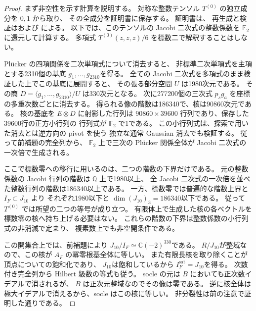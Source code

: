\begin{proof}
まず非空性を示す計算を説明する。
対称な整数テンソル $T^{(0)}$ の独立成分を $0,1$ から取り、
その全成分を証明書に保存する。
証明書は、
再生成と検証はおよび
による。
以下では、このテンソルの Jacobi 二次式の整数係数を
$\mathbb F_2$ に還元して計算する。
多項式 $T^{(0)}(z,z,z)/6$ を標数二で解釈することはしない。

Pl\"ucker の四項関係を二次単項式について消去すると、
非標準二次単項式を主項とする2310個の基底
$g_1,\ldots,g_{2310}$を得る。
全ての Jacobi 二次式を多項式のまま検証した上でこの基底に展開すると、
その張る部分空間 $U$ は1980次元である。
その商 $D=\langle g_1,\ldots,g_{2310}\rangle/U$ は330次元となる。
次に277200個の三次式 $p_sg_a$ を座標の多重次数ごとに消去する。
得られる像の階数は186340で、核は90860次元である。
核の基底を $E\otimes D$ に射影した行列は
$90860\times39600$ 行列であり、保存した39600行の正方小行列の
行列式が $\mathbb F_2$ で1である。
この小行列式は、探索で用いた消去とは逆方向の pivot を使う
独立な通常 Gaussian 消去でも検証する。
従って前補題の完全列から、
$\mathbb F_2$ 上で三次の Pl\"ucker 関係全体が Jacobi 二次式の
一次倍で生成される。

ここで標数零への移行に用いるのは、二つの階数の下界だけである。
元の整数係数の Jacobi 行列の階数は $\mathbb Q$ 上で1980以上、
全 Jacobi 二次式の一次倍を並べた整数行列の階数は186340以上である。
一方、標数零では普遍的な階数上界と $I_F\subset J_{10}$ より
それぞれ1980以下と $\dim(J_{10})_3=186340$以下である。
従って $T^{(0)}$ では所望の二つの等号が成り立つ。
有限体上で生成した核の各ベクトルを標数零の核へ持ち上げる必要はない。
これらの階数の下界は整数係数の小行列式の非消滅で定まり、
複素数上でも非空開条件である。

この開集合上では、前補題により
$J_{10}/I_F\simeq\mathbb C(-2)^{330}$である。
$R/J_{10}$が整域なので、この核が $A_F$ の冪零根基全体に等しい。
また有限長核を取り除くことが頂点についての飽和化であり、
$J_{10}$は飽和しているから $I_F^{\mathrm{sat}}=J_{10}$を得る。
次数付き完全列から Hilbert 級数の等式も従う。
socle の元は $B$ においても正次数イデアルで消されるが、
$B$ は正次元整域なのでその像は零である。
逆に核全体は極大イデアルで消えるから、socle はこの核に等しい。
非分裂性は前の注意で証明した通りである。
\end{proof}

